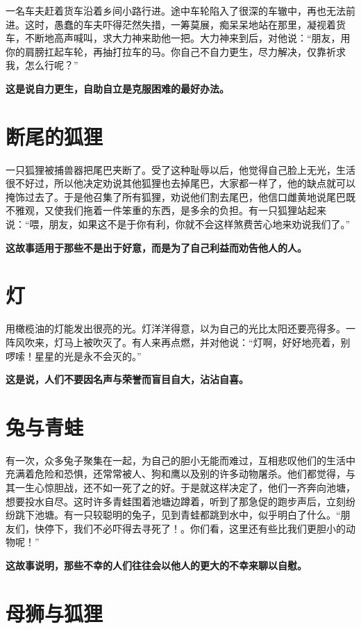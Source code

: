 一名车夫赶着货车沿着乡间小路行进。途中车轮陷入了很深的车辙中，再也无法前进。这时，愚蠢的车夫吓得茫然失措，一筹莫展，痴呆呆地站在那里，凝视着货车，不断地高声喊叫，求大力神来助他一把。大力神来到后，对他说：“朋友，用你的肩膀扛起车轮，再抽打拉车的马。你自己不自力更生，尽力解决，仅靠祈求我，怎么行呢？”

{\bfseries \color{red}这是说自力更生，自助自立是克服困难的最好办法。}

\section{断尾的狐狸}

一只狐狸被捕兽器把尾巴夹断了。受了这种耻辱以后，他觉得自己脸上无光，生活很不好过，所以他决定劝说其他狐狸也去掉尾巴，大家都一样了，他的缺点就可以掩饰过去了。于是他召集了所有狐狸，劝说他们割去尾巴，他信口雌黄地说尾巴既不雅观，又使我们拖着一件笨重的东西，是多余的负担。有一只狐狸站起来说：“喂，朋友，如果这不是于你有利，你就不会这样煞费苦心地来劝说我们了。”

{\bfseries \color{red}这故事适用于那些不是出于好意，而是为了自己利益而劝告他人的人。}

\section{灯}

用橄榄油的灯能发出很亮的光。灯洋洋得意，以为自己的光比太阳还要亮得多。一阵风吹来，灯马上被吹灭了。有人来再点燃，并对他说：“灯啊，好好地亮着，别啰嗦！星星的光是永不会灭的。”

{\bfseries \color{red}这是说，人们不要因名声与荣誉而盲目自大，沾沾自喜。}

\section{兔与青蛙}

有一次，众多兔子聚集在一起，为自己的胆小无能而难过，互相悲叹他们的生活中充满着危险和恐惧，还常常被人、狗和鹰以及别的许多动物屠杀。他们都觉得，与其一生心惊胆战，还不如一死了之的好。于是就这样决定了，他们一齐奔向池塘，想要投水自尽。这时许多青蛙围着池塘边蹲着，听到了那急促的跑步声后，立刻纷纷跳下池塘。有一只较聪明的兔子，见到青蛙都跳到水中，似乎明白了什么。“朋友们，快停下，我们不必吓得去寻死了！。你们看，这里还有些比我们更胆小的动物呢！”

{\bfseries \color{red}这故事说明，那些不幸的人们往往会以他人的更大的不幸来聊以自慰。}

\section{母狮与狐狸}

